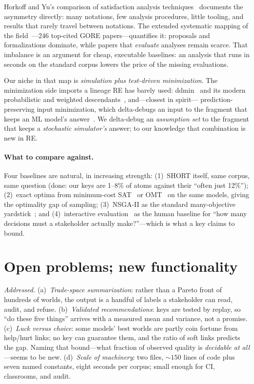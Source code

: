 \documentclass[sigconf,nonacm]{acmart}
\begin{document}
Horkoff and Yu's comparison of satisfaction analysis
techniques~\cite{horkoff12} documents the asymmetry directly:
many notations, few analysis procedures, little tooling, and
results that rarely travel between notations. The extended
systematic mapping of the field~\cite{horkoff19}---246
top-cited GORE papers---quantifies it: proposals and
formalizations dominate, while papers that \emph{evaluate}
analyses remain scarce. That imbalance is an argument for
cheap, executable baselines: an analysis that runs in seconds
on the standard corpus lowers the price of the missing
evaluations.

Our niche in that map is \emph{simulation plus test-driven
minimization}. The minimization side imports a lineage RE has
barely used: ddmin~\cite{zeller02} and its modern probabilistic and
weighted descendants~\cite{probdd24,wdd25}, and---closest in
spirit---%
prediction-preserving input minimization, which delta-debugs an
input to the fragment that keeps an ML model's
answer~\cite{suneja20}. We delta-debug an \emph{assumption set}
to the fragment that keeps a \emph{stochastic simulator's}
answer; to our knowledge that combination is new in RE.

\paragraph{What to compare against.} Four baselines are
natural, in increasing strength: (1)~SHORT itself, same corpus,
same question (done: our keys are 1--8\% of atoms against their
``often just 12\%''); (2)~exact optima from minimum-cost
SAT~\cite{sebastiani04} or OMT~\cite{nguyen16} on the same
models, giving the optimality gap of sampling; (3)~NSGA-II as
the standard many-objective yardstick~\cite{mathew17}; and
(4)~interactive evaluation~\cite{horkoff14} as the human
baseline for ``how many decisions must a stakeholder actually
make?''---which is what a key claims to bound.

\section{Open problems; new functionality}

\emph{Addressed.} (a)~\emph{Trade-space summarization}: rather
than a Pareto front of hundreds of worlds, the output is a
handful of labels a stakeholder can read, audit, and refuse.
(b)~\emph{Validated recommendations}: keys are tested by
replay, so ``do these five things'' arrives with a measured
mean and variance, not a promise. (c)~\emph{Luck versus
choice}: some models' best worlds are partly coin fortune from
help/hurt links; no key can guarantee them, and the ratio of
soft links predicts the gap. Naming that bound---what fraction
of observed quality is \emph{decidable at all}---seems to be
new. (d)~\emph{Scale of machinery}: two files, ${\sim}150$
lines of code plus seven named constants, eight seconds per
corpus; small enough for CI, classrooms, and audit.
\end{document}

